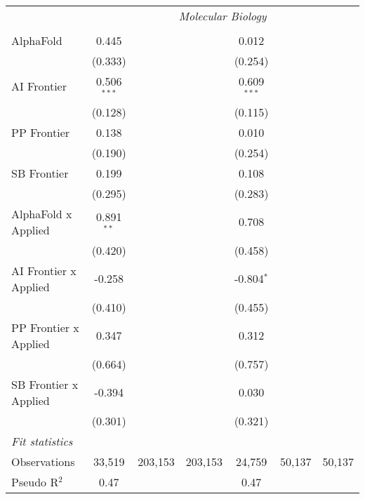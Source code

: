 \begin{tabular}{lcccccc}
 & \multicolumn{6}{c}{\textit{Molecular Biology}} \\ \\
   AlphaFold             & 0.445         &         &         & 0.012         &        &   \\   
                         & (0.333)       &         &         & (0.254)       &        &   \\   
   AI Frontier           & 0.506$^{***}$ &         &         & 0.609$^{***}$ &        &   \\   
                         & (0.128)       &         &         & (0.115)       &        &   \\   
   PP Frontier           & 0.138         &         &         & 0.010         &        &   \\   
                         & (0.190)       &         &         & (0.254)       &        &   \\   
   SB Frontier           & 0.199         &         &         & 0.108         &        &   \\   
                         & (0.295)       &         &         & (0.283)       &        &   \\   
   AlphaFold x Applied   & 0.891$^{**}$  &         &         & 0.708         &        &   \\   
                         & (0.420)       &         &         & (0.458)       &        &   \\   
   AI Frontier x Applied & -0.258        &         &         & -0.804$^{*}$  &        &   \\   
                         & (0.410)       &         &         & (0.455)       &        &   \\   
   PP Frontier x Applied & 0.347         &         &         & 0.312         &        &   \\   
                         & (0.664)       &         &         & (0.757)       &        &   \\   
   SB Frontier x Applied & -0.394        &         &         & 0.030         &        &   \\   
                         & (0.301)       &         &         & (0.321)       &        &   \\   
   \midrule
   \emph{Fit statistics}\\
   Observations          & 33,519        & 203,153 & 203,153 & 24,759        & 50,137 & 50,137\\  
   Pseudo R$^2$          & 0.47          &         &         & 0.47          &        & \\  
   

\end{tabular}
